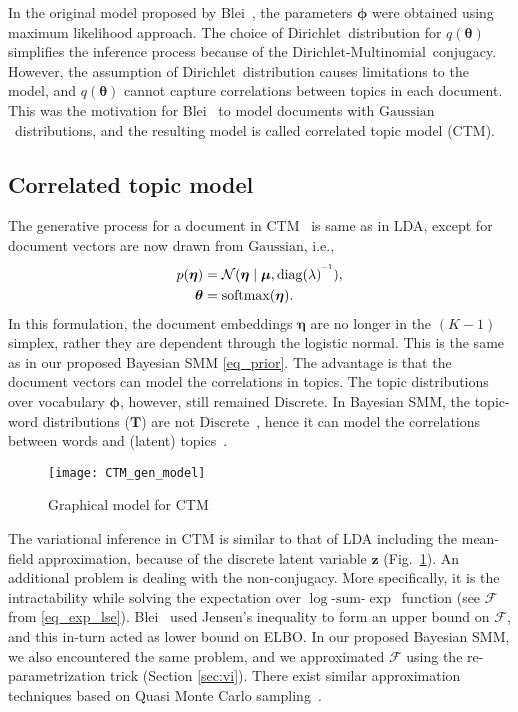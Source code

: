 \documentclass[journal]{IEEEtran}
\newcommand{\mb}[1]{\bm{#1}}
\newcommand{\bs}[1]{\bm{#1}}
\newcommand{\lse}{\(\log\)-\(\mathrm{sum}\)-\(\exp\)}      \newcommand{\Dir}{\(\mathrm{Dirichlet}\)}
\newcommand{\Dis}{\(\mathrm{Discrete}\)}
\newcommand{\Mul}{\(\mathrm{Multinomial}\)}
\newcommand{\Gau}{\(\mathrm{Gaussian}\)}
\begin{document}
In the original model proposed by Blei~\cite{Blei:2003:LDA}, the parameters \(\bs{\phi}\) were obtained using maximum likelihood approach. The choice of \Dir~distribution for \(q(\bs{\theta})\)  simplifies the inference process because of the \Dir-\Mul~conjugacy. However, the assumption of \Dir~distribution causes limitations to the model, and \(q(\bs{\theta})\) cannot capture correlations between topics in each document.
This was the motivation for Blei~\cite{Blei:2005:CTM} to model documents with \Gau~distributions, and the resulting model is called correlated topic model (CTM).

\subsection{Correlated topic model}
The generative process for a document in CTM~\cite{Blei:2005:CTM} is same as in 
LDA, except for document vectors are now drawn from \Gau, i.e.,
\begin{align}
p(\bs{\eta})  &= \mathcal{N}(\bs{\eta} \mid \bs{\mu}, \mathrm{diag}(\lambda)^{\I}), \\
\bs{\theta} &= \mathrm{softmax}(\bs{\eta}). \label{eq_ctm_softmax}
\end{align}
In this formulation, the document embeddings \(\bs{\eta}\) are no longer in the 
\((K-1)\) simplex, rather they are dependent through the logistic normal. This 
is the same as in our proposed Bayesian SMM \eqref{eq_prior}. The advantage is 
that the document vectors can model the correlations in topics. The topic 
distributions over vocabulary \(\bs{\phi}\), however, still remained \Dis.
In Bayesian SMM, the topic-word distributions (\(\mb{T}\)) are not \Dis~, hence 
it can model the correlations between words and (latent) 
topics~\cite{Blei:2005:CTM}.
\begin{figure}[t!]
	\centering
	\texttt{[image: CTM\_gen\_model]}
	\caption{Graphical model for CTM} \label{fig:ctm}
\end{figure}


The variational inference in CTM is similar to that of LDA including the 
mean-field approximation, because of the discrete latent variable \(\mb{z}\) 
(Fig.~\ref{fig:ctm}). An additional problem is dealing with the non-conjugacy. 
More specifically, it is the intractability while solving the expectation over 
\lse~function (see \(\mathcal{F}\) from \eqref{eq_exp_lse}). 
Blei~\cite{Blei:2005:CTM} used Jensen's inequality to form an upper bound on 
\(\mathcal{F}\), and this in-turn acted as lower bound on ELBO. In our proposed 
Bayesian SMM, we also encountered the same problem, and we approximated 
\(\mathcal{F}\) using  the re-parametrization trick (Section \ref{sec:vi}). 
There exist similar approximation techniques based on Quasi Monte Carlo 
sampling~\cite{Depraetere:2017:mixed}.
\end{document}
